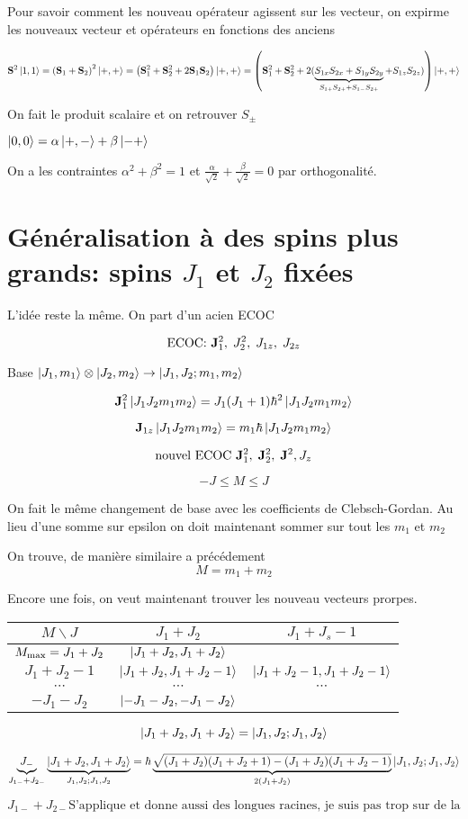 \documentclass{article}
\begin{document}
Pour savoir comment les nouveau opérateur agissent sur les vecteur, on expirme les nouveaux vecteur et opérateurs en fonctions des anciens

$$\vb S^2\ket{1,1} = \qty(\vb S_1 + \vb S_2)^2\ket{+,+} = \qty(\vb S_1^2 + \vb S_2^2 + 2\vb S_1 \vb S_2)\ket{+,+}
 = \qty(\vb S_1^2 + \vb S_2^2 + 2(\underbrace{S_{1x}S_{2x} + S_{1y}S_{2y}}_{S_{1+}S_{2+} +S_{1-}S_{2+} } + S_{1z}S_{2z}))\ket{+,+}$$

On fait le produit scalaire et on retrouver $S_\pm$


$\ket{0,0} = \alpha\ket{+,-}+\beta\ket{-+}$

On a les contraintes $\alpha^2 + \beta^2 = 1$ et $\frac{\alpha}{\sqrt{2}} + \frac{\beta}{\sqrt{2}} = 0$ par orthogonalité.

\section*{Généralisation à des spins plus grands: spins $J_1$ et $J_2$ fixées}

L'idée reste la même. On part d'un acien ECOC

$$\text{ECOC: } \vb J_1^2,\; J_2^2,\; J_{1z},\; J_{2z}$$

Base $\ket{J_1, m_1} \otimes \ket{J_2, m_2} \to \ket{J_1, J_2; m_1, m_2}$

$$\vb J_1^2 \ket{J_1J_2m_1m_2} = J_{1}(J_{1}+1)\hbar^2\ket{J_1J_2m_1m_2}$$

$$\vb J_{1z}\ket{J_1J_2m_1m_2} = m_1\hbar\ket{J_1J_2m_1m_2}$$


$$\text{nouvel ECOC } \vb J_1^2, \; \vb J_2^2, \; \vb J^2, J_z$$

$$\boxed{-J \leq M \leq J}$$

On fait le même changement de base avec les coefficients de Clebsch-Gordan. Au lieu d'une somme sur epsilon on doit maintenant sommer sur tout les $m_1$ et $m_2$

On trouve, de manière similaire a précédement 
$$\boxed{M = m_1+m_2}$$

Encore une fois, on veut maintenant trouver les nouveau vecteurs prorpes.

\begin{tabular}{|c|c|c|}
	\hline
	$M\backslash J$ & $J_1+J_2$ & $J_1 + J_s -1$\\\hline
	$M_{\rm max} = J_1 + J_2$ & $\ket{J_1+J_2, J_1+J_2}$ &\\\hline
	$J_1 + J_2 -1$& $\ket{J_1+J_2, J_1 + J_2-1}$ & $\ket{J_1+J_2-1, J_1+J_2-1}$\\\hline
	$\dotsb$ & $\dotsb$&$\dotsb$\\\hline
	$-J_1-J_2$ & $\ket{-J_1-J_2, -J_1-J_2}$ &
\end{tabular}

$$\ket{J_1+J_2, J_1+J_2} = \ket{J_1, J_2; J_1, J_2}$$

$$\underbrace{J_-}_{J_{1-}+J_{2-}}\underbrace{\ket{J_1+J_2, J_1+J_2}}_{J_1,J_2; J_1, J_2} = \hbar\underbrace{\sqrt{(J_1+J_2)(J_1+J_2+1)-(J_1+J_2)(J_1+J_2-1)}}_{2(J_1+J_2)}\ket{J_1, J_2; J_1, J_2} $$

$$J_{1-}+J_{2-}\text{S'applique et donne aussi des longues racines, je suis pas trop sur de la conclusion... On verifié que ça marche je crois}$$
\end{document}
